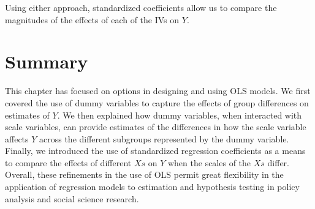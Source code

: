 \documentclass[11pt,openany]{book}
\begin{document}
Using either approach, standardized coefficients allow us to compare the magnitudes of the effects of each of the IVs on $Y$.

\section{Summary}
This chapter has focused on options in designing and using OLS models. We first covered the use of dummy variables to capture the effects of group differences on estimates of $Y$. We then explained how dummy variables, when interacted with scale variables, can provide estimates of the differences in how the scale variable affects $Y$ across the different subgroups represented by the dummy variable. Finally, we introduced the use of standardized regression coefficients as a means to compare the effects of different $Xs$ on $Y$ when the scales of the $Xs$ differ. Overall, these refinements in the use of OLS permit great flexibility in the application of regression models to estimation and hypothesis testing in policy analysis and social science research.
\end{document}
